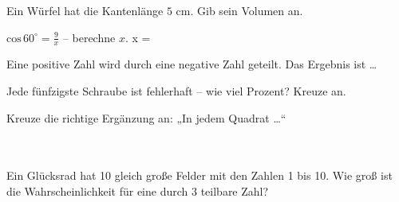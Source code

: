 \documentclass[11pt]{article}
\begin{document}
\noindent\begin{minipage}[t]{0.485\linewidth}\raggedright
\begin{aufgabe}{Ein Würfel hat die Kantenlänge $5$ cm. Gib sein Volumen an. \leerfeld[cm³]}
\end{aufgabe}
\end{minipage}\hfill\begin{minipage}[t]{0.485\linewidth}\raggedright
\begin{aufgabe}{$\mathrm{cos}\,60^\circ = \frac{9}{x}$ – berechne $x$. x = \leerfeld}
\end{aufgabe}
\end{minipage}\par

\begin{aufgabe}{Eine positive Zahl wird durch eine negative Zahl geteilt. Das Ergebnis ist … \\   }
\end{aufgabe}

\begin{aufgabe}{Jede fünfzigste Schraube ist fehlerhaft – wie viel Prozent? Kreuze an. \\    }
\end{aufgabe}

\begin{aufgabe}{Kreuze die richtige Ergänzung an: „In jedem Quadrat …“\\ \\ \\ }
\end{aufgabe}

\begin{aufgabe}{Ein Glücksrad hat 10 gleich große Felder mit den Zahlen 1 bis 10. Wie groß ist die Wahrscheinlichkeit für eine durch 3 teilbare Zahl? \leerfeld}
\end{aufgabe}
\end{document}
